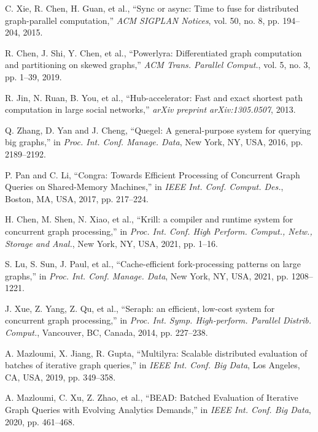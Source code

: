 \documentclass[lettersize,journal]{IEEEtran} %
\begin{document}
\begin{thebibliography}{100}
  C. Xie, R. Chen, H. Guan, et al., ``Sync or async: Time to fuse for distributed graph-parallel computation,'' \textit{ACM SIGPLAN Notices}, vol. 50, no. 8, pp. 194--204, 2015.
  
  R. Chen, J. Shi, Y. Chen, et al., ``Powerlyra: Differentiated graph computation and partitioning on skewed graphs,'' \textit{ACM Trans. Parallel Comput.}, vol. 5, no. 3, pp. 1--39, 2019.

  R. Jin, N. Ruan, B. You, et al., ``Hub-accelerator: Fast and exact shortest path computation in large social networks,'' \textit{arXiv preprint arXiv:1305.0507}, 2013.
  
  Q. Zhang, D. Yan and J. Cheng, ``Quegel: A general-purpose system for querying big graphs,'' in \textit{Proc. Int. Conf. Manage. Data}, New York, NY, USA, 2016, pp. 2189--2192.
  
  P. Pan and C. Li, ``Congra: Towards Efficient Processing of Concurrent Graph Queries on Shared-Memory Machines,'' in \textit{IEEE Int. Conf. Comput. Des.}, Boston, MA, USA, 2017, pp. 217--224.
  
  H. Chen, M. Shen, N. Xiao, et al., ``Krill: a compiler and runtime system for concurrent graph processing,'' in \textit{Proc. Int. Conf. High Perform. Comput., Netw., Storage and Anal.}, New York, NY, USA, 2021, pp. 1--16.
  
  S. Lu, S. Sun, J. Paul, et al., ``Cache-efficient fork-processing patterns on large graphs,'' in \textit{Proc. Int. Conf. Manage. Data}, New York, NY, USA, 2021, pp. 1208--1221.
  
  J. Xue, Z. Yang, Z. Qu, et al., ``Seraph: an efficient, low-cost system for concurrent graph processing,'' in \textit{Proc. Int. Symp. High-perform. Parallel Distrib. Comput.}, Vancouver, BC, Canada, 2014, pp. 227--238.
  
  A. Mazloumi, X. Jiang, R. Gupta, ``Multilyra: Scalable distributed evaluation of batches of iterative graph queries,'' in \textit{IEEE Int. Conf. Big Data}, Los Angeles, CA, USA, 2019, pp. 349--358.
  
  A. Mazloumi, C. Xu, Z. Zhao, et al., ``BEAD: Batched Evaluation of Iterative Graph Queries with Evolving Analytics Demands,'' in \textit{IEEE Int. Conf. Big Data}, 2020, pp. 461--468.
  
  
  \end{thebibliography}
\end{document}
